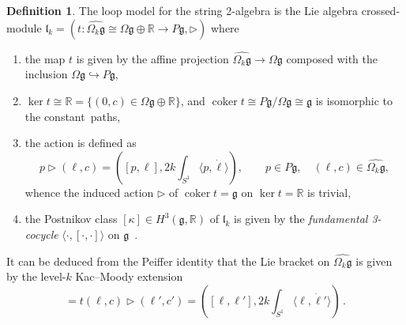\documentclass[onecolumn]{article}
\theoremstyle{theorem}
\theoremstyle{remark}
\theoremstyle{example}
\theoremstyle{definition}
\newtheorem{definition}{Definition}[section]
\numberwithin{equation}{section}
\def\g{\mathfrak g}
\def\bbZ{\mathbb{Z}}
\begin{document}
 \begin{definition}
     The {{loop model}} for the string 2-algebra is the Lie algebra crossed-module $\mathfrak{l}_k = (t:\widehat{\Omega_k\mathfrak{g}}\cong\Omega\mathfrak{g}\oplus\mathbb{R}\rightarrow P\mathfrak{g},\rhd)$ where 
     \begin{enumerate}
    \item the map $t$ is given by the affine projection $\widehat{\Omega_k\mathfrak{g}}\rightarrow\Omega\mathfrak{g}$ composed with the inclusion $\Omega\mathfrak{g}\hookrightarrow P\mathfrak{g}$,
    \item $\operatorname{ker}t\cong\mathbb{R}=\{(0,c)\in \Omega\mathfrak{g}\oplus\mathbb{R}\}$, and $\operatorname{coker}t\cong P\mathfrak{g}/\Omega\mathfrak{g}\cong \mathfrak{g}$ is isomorphic to the constant~paths,
    \item the action is defined as
    \begin{equation}
        p\rhd (\ell,c) = ([p,\ell], 2k\int_{S^1}\langle p,\dot\ell\rangle),\qquad p\in P\mathfrak{g},\quad (\ell,c)\in \widehat{\Omega_k\mathfrak{g}},\label{eq:action}
\end{equation}
whence the induced action $\rhd$ of $\operatorname{coker}t=\mathfrak{g}$ on $\operatorname{ker}t=\mathbb{R}$ is trivial,  
\item the Postnikov class $[\kappa]\in H^3(\mathfrak{g},\mathbb{R})$ of $\mathfrak{l}_k$ is given by the {\it fundamental 3-cocycle} $\langle\cdot,[\cdot,\cdot]\rangle$ on $\mathfrak{g}$~\cite{book-loop,Baez:2005sn}.
\end{enumerate}
 \end{definition}

{It }%
 can be deduced from the Peiffer identity that the Lie bracket on $\widehat{\Omega_k\mathfrak{g}}$ is given by the level-$k$ Kac--Moody extension
\begin{equation}
    [(\ell,c),(\ell',c')] = t(\ell,c)\rhd (\ell',c') = ([\ell,\ell'],2k\int_{S^1}\langle\ell,\dot\ell'\rangle)\,.\nonumber
\end{equation}

\end{document}
